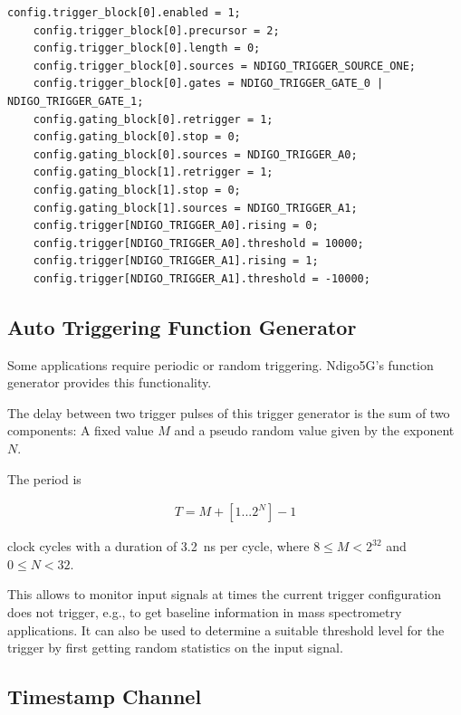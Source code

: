 \begin{lstlisting}[frame=tlrb]
    config.trigger_block[0].enabled = 1;
    config.trigger_block[0].precursor = 2;
    config.trigger_block[0].length = 0;
    config.trigger_block[0].sources = NDIGO_TRIGGER_SOURCE_ONE;
    config.trigger_block[0].gates = NDIGO_TRIGGER_GATE_0 | NDIGO_TRIGGER_GATE_1;
    config.gating_block[0].retrigger = 1;
    config.gating_block[0].stop = 0;
    config.gating_block[0].sources = NDIGO_TRIGGER_A0;
    config.gating_block[1].retrigger = 1;
    config.gating_block[1].stop = 0;
    config.gating_block[1].sources = NDIGO_TRIGGER_A1;
    config.trigger[NDIGO_TRIGGER_A0].rising = 0;
    config.trigger[NDIGO_TRIGGER_A0].threshold = 10000;
    config.trigger[NDIGO_TRIGGER_A1].rising = 1;
    config.trigger[NDIGO_TRIGGER_A1].threshold = -10000;
\end{lstlisting}

    \subsection{Auto Triggering Function Generator\label{cp:AutoTriggeringFunctionGenerator}}

        Some applications require periodic or random triggering. Ndigo5G's function generator provides this functionality.\par

        The delay between two trigger pulses of this trigger generator is the sum of two components: A fixed value $M$ and a pseudo random value given by the exponent $N$. \par

        The period is

        \begin{align}
            T = M + [1...2^N] - 1
        \end{align}

        clock cycles with a duration of 3.2~ns per cycle, where $8 \leq M < 2^{32}$ and $0 \leq N < 32$.\par

        This allows to monitor input signals at times the current trigger configuration does not trigger, e.g., to get baseline information in mass spectrometry applications. It can also be used to determine a suitable threshold level for the trigger by first getting random statistics on the input signal.

    \subsection{Timestamp Channel}

